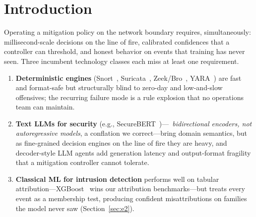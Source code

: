 \documentclass[sigconf,anonymous=false]{acmart}
\begin{document}
\begin{abstract}
ranking partially survives, and the drift is open-set (a family absent from training), which defeats label-shift estimators by assumption. We contribute not novel estimators but a measured account of where typed calibrated decisions help perimeter triage, and where they fail.
\end{abstract}



\maketitle

\section{Introduction}
\label{sec:intro}

Operating a mitigation policy on the network boundary requires, simultaneously: millisecond-scale decisions on the line of fire, calibrated confidences that a controller can threshold, and honest behavior on events that training has never seen. Three incumbent technology classes each miss at least one requirement.

\begin{enumerate}
  \item \textbf{Deterministic engines} (Snort~\cite{roesch1999snort}, Suricata~\cite{suricata}, Zeek/Bro~\cite{paxson1999bro}, YARA~\cite{yara}) are fast and format-safe but structurally blind to zero-day and low-and-slow offensives; the recurring failure mode is a rule explosion that no operations team can maintain.
  \item \textbf{Text LLMs for security} (e.g., SecureBERT~\cite{aghaei2022securebert})---~\emph{bidirectional encoders, not autoregressive models}, a conflation we correct---bring domain semantics, but as fine-grained decision engines on the line of fire they are heavy, and decoder-style LLM agents add generation latency and output-format fragility that a mitigation controller cannot tolerate.
  \item \textbf{Classical ML for intrusion detection} performs well on tabular attribution---XGBoost~\cite{chen2016xgboost} wins our attribution benchmarks---but treats every event as a membership test, producing confident misattributions on families the model never saw (Section~\ref{sec:e2}).
\end{enumerate}
\end{document}
